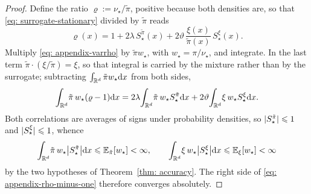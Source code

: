 \documentclass{article}
\begin{document}
\begin{proof}
Define the ratio $\varrho := \nu_\star/\tilde\pi$, positive because both densities are, so that \eqref{eq: surrogate-stationary} divided by $\tilde\pi$ reads
\begin{equation}
    \varrho(x) = 1 + 2\lambda\,S^{\tilde\pi}_\star(x) + 2\vartheta\,\frac{\xi(x)}{\tilde\pi(x)}\,S^{\xi}_\star(x) .
    \label{eq: appendix-varrho}
\end{equation}
Multiply \eqref{eq: appendix-varrho} by $\tilde\pi w_\star$, with $w_\star=\pi/\nu_\star$, and integrate. In the last term $\tilde\pi\cdot(\xi/\tilde\pi)=\xi$, so that integral is carried by the mixture rather than by the surrogate; subtracting $\int_{\mathbb R^d}\tilde\pi w_\star\mathrm{d} x$ from both sides,
\begin{equation}
    \int_{\mathbb R^d}\!\tilde\pi\,w_\star(\varrho-1)\mathrm{d} x
    = 2\lambda\!\int_{\mathbb R^d}\!\tilde\pi\,w_\star S^{\tilde\pi}_\star\mathrm{d} x
    + 2\vartheta\!\int_{\mathbb R^d}\!\xi\,w_\star S^{\xi}_\star\mathrm{d} x .
    \label{eq: appendix-rho-minus-one}
\end{equation}
Both correlations are averages of signs under probability densities, so $|S^{\tilde\pi}_\star|\leqslant1$ and $|S^{\xi}_\star|\leqslant1$, whence
\begin{equation*}
	\int_{\mathbb R^d}\!\tilde\pi\,w_\star\bigl|S^{\tilde\pi}_\star\bigr|\mathrm{d} x \leqslant \mathbb E_{\tilde\pi}[w_\star] < \infty ,
	\qquad
	\int_{\mathbb R^d}\!\xi\,w_\star\bigl|S^{\xi}_\star\bigr|\mathrm{d} x \leqslant \mathbb E_{\xi}[w_\star] < \infty
\end{equation*}
by the two hypotheses of Theorem~\ref{thm: accuracy}. The right side of \eqref{eq: appendix-rho-minus-one} therefore converges absolutely.


\end{proof}
\end{document}
